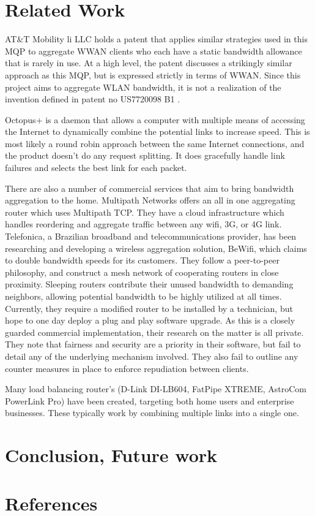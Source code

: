 \documentclass[12pt]{article}
\begin{document}
\newpage
\section{Related Work}

		AT\&T Mobility li LLC holds a patent that applies similar strategies used in this MQP to aggregate WWAN clients who each have a static bandwidth allowance that is rarely in use. At a high level, the patent discusses a strikingly similar approach as this MQP, but is expressed strictly in terms of WWAN. Since this project aims to aggregate WLAN bandwidth, it is not a realization of the invention defined in patent no US7720098 B1 \cite{allen2010wireless}.
		
		Octopus+ is a daemon that allows a computer with multiple means of accessing the Internet to dynamically combine the potential links to increase speed. This is most likely a round robin approach between the same Internet connections, and the product doesn't do any request splitting. It does gracefully handle link failures and selects the best link for each packet.
		
		There are also a number of commercial services that aim to bring bandwidth aggregation to the home. Multipath Networks offers an all in one aggregating router which uses Multipath TCP. They have a cloud infrastructure which handles reordering and aggregate traffic between any wifi, 3G, or 4G link. Telefonica, a Brazilian broadband and telecommunications provider, has been researching and developing a wireless aggregation solution, BeWifi, which claims to double bandwidth speeds for its customers. They follow a peer-to-peer philosophy, and construct a mesh network of cooperating routers in close proximity. Sleeping routers contribute their unused bandwidth to demanding neighbors, allowing potential bandwidth to be highly utilized at all times. Currently, they require a modified router to be installed by a technician, but hope to one day deploy a plug and play software upgrade. As this is a closely guarded commercial implementation, their research on the matter is all private. They note that fairness and security are a priority in their software, but fail to detail any of the underlying mechanism involved. They also fail to outline any counter measures in place to enforce repudiation between clients. 
		
		Many load balancing router's (D-Link DI-LB604, FatPipe XTREME, AstroCom PowerLink Pro) have been created, targeting both home users and enterprise businesses. These typically work by combining multiple links into a single one. 




\newpage
\section{Conclusion, Future work}


\newpage
\section{References}
\printbibliography
\end{document}
